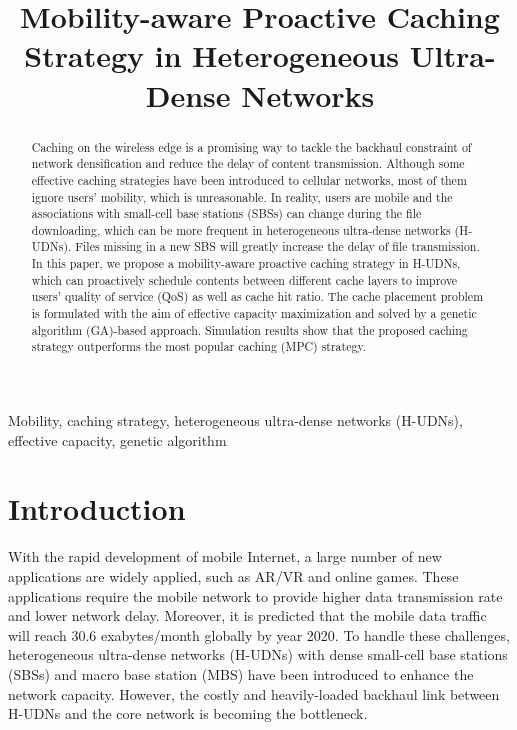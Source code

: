 \documentclass[conference]{IEEEtran}
\begin{document}
\title{Mobility-aware Proactive Caching Strategy in Heterogeneous Ultra-Dense Networks}

\author{
}

\maketitle

\begin{abstract}
Caching on the wireless edge is a promising way to tackle the backhaul constraint of network densification and reduce the delay of content transmission. Although some effective caching strategies have been introduced to cellular networks, most of them ignore users' mobility, which is unreasonable. In reality, users are mobile and the associations with small-cell base stations (SBSs) can change during the file downloading, which can be more frequent in heterogeneous ultra-dense networks (H-UDNs). Files missing in a new SBS will greatly increase the delay of file transmission. In this paper, we propose a mobility-aware proactive caching strategy in H-UDNs, which can proactively schedule contents between different cache layers to improve users’ quality of service (QoS) as well as cache hit ratio. The cache placement problem is formulated with the aim of effective capacity maximization and solved by a genetic algorithm (GA)-based approach. Simulation results show that the proposed caching strategy outperforms the most popular caching (MPC) strategy.
\end{abstract}

\begin{IEEEkeywords}
 Mobility, caching strategy, heterogeneous ultra-dense networks (H-UDNs), effective capacity, genetic algorithm
\end{IEEEkeywords}

\section{Introduction}
With the rapid development of mobile Internet, a large number of new applications are widely applied, such as AR/VR and online games. These applications require the mobile network to provide higher data transmission rate and lower network delay. Moreover, it is predicted that the mobile data traffic will reach 30.6 exabytes/month globally by year 2020\cite{cisco}. To handle these challenges, heterogeneous ultra-dense networks (H-UDNs) with dense small-cell base stations (SBSs) and macro base station (MBS) have been introduced to enhance the network capacity. However, the costly and heavily-loaded backhaul link between H-UDNs and the core network is becoming the bottleneck\cite{6963798}.
\end{document}
